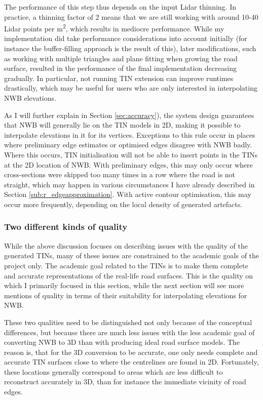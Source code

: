 The performance of this step thus depends on the input Lidar thinning. In practice, a thinning factor of 2 means that we are still working with around 10-40 Lidar points per m\textsuperscript{2}, which results in mediocre performance. While my implementation did take performance considerations into account initially (for instance the buffer-filling approach is the result of this), later modifications, such as working with multiple triangles and plane fitting when growing the road surface, resulted in the performance of the final implementation decreasing gradually. In particular, not running TIN extension can improve runtimes drastically, which may be useful for users who are only interested in interpolating NWB elevations.

As I will further explain in Section \ref{sec:accuracy}), the system design guarantees that NWB will generally lie on the TIN models in 2D, making it possible to interpolate elevations in it for its vertices. Exceptions to this rule occur in places where preliminary edge estimates or optimised edges disagree with NWB badly. Where this occurs, TIN initialisation will not be able to insert points in the TINs at the 2D location of NWB. With preliminary edges, this may only occur where cross-sections were skipped too many times in a row where the road is not straight, which may happen in various circumstances I have already described in Section \ref{sub:r_edgeapproximation}. With active contour optimisation, this may occur more frequently, depending on the local density of generated artefacts.

\subsubsection{Two different kinds of quality}

While the above discussion focuses on describing issues with the quality of the generated TINs, many of these issues are constrained to the academic goals of the project only. The academic goal related to the TINs is to make them complete and accurate representations of the real-life road surfaces. This is the quality on which I primarily focused in this section, while the next section will see more mentions of quality in terms of their suitability for interpolating elevations for NWB.

These two qualities need to be distinguished not only because of the conceptual differences, but because there are much less issues with the less academic goal of converting NWB to 3D than with producing ideal road surface models. The reason is, that for the 3D conversion to be accurate, one only needs complete and accurate TIN surfaces close to where the centrelines are found in 2D. Fortunately, these locations generally correspond to areas which are less difficult to reconstruct accurately in 3D, than for instance the immediate vicinity of road edges.

